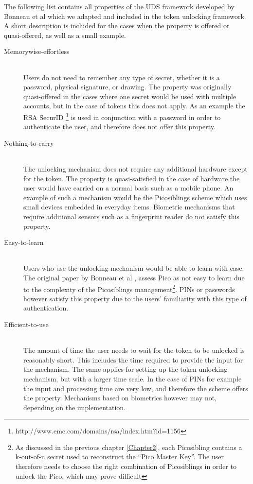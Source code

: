 The following list contains all properties of the UDS framework developed by Bonneau et al \cite{bonneau2012quest} which we adapted and included in the token unlocking framework. A short description is included for the cases when the property is offered or quasi-offered, as well as a small example.
\begin{description}
  
  \item[Memorywise-effortless] \hfill \\
  Users do not need to remember any type of secret, whether it is a password, physical signature, or drawing. The property was originally quasi-offered in the cases where one secret would be used with multiple accounts, but in the case of tokens this does not apply. As an example the RSA SecurID \footnote{http://www.emc.com/domains/rsa/index.htm?id=1156} is used in conjunction with a password in order to authenticate the user, and therefore does not offer this property.
  
  \item[Nothing-to-carry] \hfill \\
  The unlocking mechanism does not require any additional hardware except for the token. The property is quasi-satisfied in the case of hardware the user would have carried on a normal basis such as a mobile phone. An example of such a mechanism would be the Picosiblings scheme which uses small devices embedded in everyday items. Biometric mechanisms that require additional sensors such as a fingerprint reader do not satisfy this property. 
  
  \item[Easy-to-learn] \hfill \\
  Users who use the unlocking mechanism would be able to learn with ease. The original paper by Bonneau et al \cite{bonneau2012quest}, assess Pico as not easy to learn due to the complexity of the Picosiblings management\footnote{As discussed in the previous chapter \ref{Chapter2}, each Picosibling contains a k-out-of-n secret used to reconstruct the ``Pico Master Key''. The user therefore needs to choose the right combination of Picosiblings in order to unlock the Pico, which may prove difficult}. PINs or passwords however satisfy this property due to the users' familiarity with this type of authentication.
  
  \item[Efficient-to-use] \hfill \\
  The amount of time the user needs to wait for the token to be unlocked is reasonably short. This includes the time required to provide the input for the mechanism. The same applies for setting up the token unlocking mechanism, but with a larger time scale. In the case of PINs for example the input and processing time are very low, and therefore the scheme offers the property. Mechanisms based on biometrics however may not, depending on the implementation.
  

\end{description}
